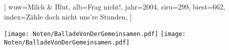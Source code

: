 [
    wuw={Milch \& Blut}, 
    alb={Frag nicht!}, 
    jahr={2004}, 
    siru={299}, 
    biest={662}, 
    index={Zähle doch nicht uns're Stunden},
]




\beginverse
\endverse
\texttt{[image: Noten/BalladeVonDerGemeinsamen.pdf]}
\texttt{[image: Noten/BalladeVonDerGemeinsamen.pdf]}

